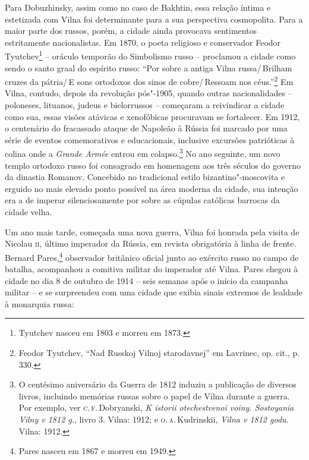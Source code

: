 Para Dobuzhinsky, assim como no caso de Bakhtin, essa relação íntima e
estetizada com Vilna foi determinante para a sua perspectiva
cosmopolita. Para a maior parte dos russos, porém, a cidade ainda
provocava sentimentos estritamente nacionalistas. Em 1870, o poeta
religioso e conservador Feodor Tyutchev\footnote{Tyutchev nasceu em 1803 e morreu em 1873.} -- oráculo temporão
do Simbolismo russo -- proclamou a cidade como sendo o santo graal do
espírito russo: ``Por sobre a antiga Vilna russa/\,Brilham cruzes da
pátria/\,E sons ortodoxos dos sinos de cobre/\,Ressoam nos
céus.''\footnote{Feodor Tyutchev, ``Nad Russkoj Vilnoj starodavnej'' em Lavrinec, op. cit., p. 330.} Em Vilna, contudo, depois da revolução pós"-1905, quando outras nacionalidades -- poloneses, lituanos, judeus e
bielorrussos -- começaram a reivindicar a cidade como sua, essas visões
atávicas e xenofóbicas procuravam se fortalecer. Em 1912, o centenário
do fracassado ataque de Napoleão à Rússia foi marcado por uma série de
eventos comemorativos e educacionais, inclusive excursões patrióticas à
colina onde a \textit{Grande Armée} entrou em colapso.\footnote{O centésimo aniversário da Guerra de 1812 induziu a publicação de diversos livros, incluindo memórias russas sobre o papel de Vilna durante a guerra. Por exemplo, ver \textsc{c.\,f.}\,Dobryanski, \textit{K istorii otechestvenoi voiny. Sostoyania Vilny v 1812 g.}, livro 3. Vilna: 1912; e \textsc{o.\,a.}\,Kudrinskii, \textit{Vilna v 1812 godu}. Vilna: 1912.} No ano seguinte, um novo templo ortodoxo russo foi consagrado em homenagem aos três séculos do governo da dinastia
Romanov. Concebido no tradicional estilo bizantino"-moscovita e erguido
no mais elevado ponto possível na área moderna da cidade, sua intenção
era a de imperar silenciosamente por sobre as cúpulas católicas barrocas
da cidade velha.

Um ano mais tarde, começada uma nova guerra, Vilna foi honrada pela
visita de Nicolau \textsc{ii}, último imperador da Rússia, em revista obrigatória
à linha de frente. Bernard Pares,\footnote{Pares nasceu em 1867 e morreu em 1949.} observador britânico
oficial junto ao exército russo no campo de batalha, acompanhou a
comitiva militar do imperador até Vilna. Pares chegou à cidade no dia 8
de outubro de 1914 -- seis semanas após o início da campanha militar -- e
se surpreendeu com uma cidade que exibia sinais extremos de lealdade à
monarquia russa:

